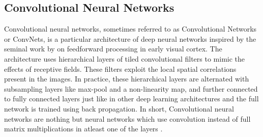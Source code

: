 \subsection*{Convolutional Neural Networks}
\label{subsection:cnn-background}
Convolutional neural networks, sometimes referred to as Convolutional Networks 
or ConvNets, is a particular architecture of deep neural networks inspired 
by the seminal work by \citet{hubel1963shape} on feedforward processing in 
early visual cortex. The architecture uses hierarchical layers of tiled 
convolutional filters to mimic the effects of receptive fields. These filters 
exploit the local spatial correlations present in the images. In 
practice, these hierarchical layers are alternated with subsampling layers like 
max-pool and a non-linearity map, and further connected to fully connected 
layers just like in other deep learning architectures and the full 
network is trained using back propagation. In short, Convolutional neural 
networks are nothing but neural networks which use convolution instead of 
full matrix multiplications in atleast one of the layers \cite{bengio-dl-book}. 
\\

